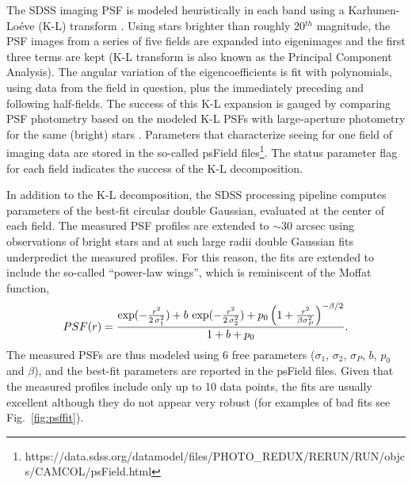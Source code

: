 The SDSS imaging PSF is modeled 
heuristically in each band using a Karhunen-Lo\'{e}ve (K-L) transform \citep{Lupton2002}. 
Using stars brighter than roughly 20$^{th}$ magnitude, the PSF images from a series of five 
fields are expanded into eigenimages and the first three terms are kept (K-L transform is 
also known as the Principal Component Analysis). The angular variation of the eigencoefficients
is fit with polynomials, using data from the field in question, plus the immediately preceding 
and following half-fields. The success of this K-L expansion is gauged by comparing PSF 
photometry based on the modeled K-L PSFs with large-aperture photometry for the same 
(bright) stars \citep{SDSSEDR}. 
Parameters that characterize seeing for one field of imaging data are stored in the so-called psField 
files\footnote{https://data.sdss.org/datamodel/files/PHOTO\_REDUX/RERUN/RUN/objcs/CAMCOL/psField.html}. 
The status parameter flag for each field indicates the success of the K-L decomposition.

In addition to the K-L decomposition, the SDSS processing pipeline computes parameters of the 
best-fit circular double Gaussian, evaluated at the center of each field. The measured PSF profiles are 
extended to $\sim$30 arcsec using observations of bright stars and at such large radii 
double Gaussian fits underpredict the measured profiles. For this reason, the fits are extended 
to include the so-called ``power-law wings'', which is reminiscent of
the Moffat function,
\begin{equation}
\label{eq:SDSSPSF}
        PSF(r) = {\exp(-{r^2\over 2\,\sigma_1^2}) + b\,\exp(-{r^2\over 2\,\sigma_2^2})
           + p_0\left(1 + { r^2 \over \beta \sigma_P^2}\right)^{-\beta/2} \over 1 + b + p_0}.
\end{equation} 
The measured PSFs are thus modeled using 6 free parameters ($\sigma_1$, $\sigma_2$, $\sigma_P$,
$b$, $p_0$ and $\beta$), and the best-fit parameters are reported in the psField files. 
Given that the measured profiles include only up to 10 data points, the fits are usually excellent
although they do not appear very robust (for examples of bad fits see Fig.~\ref{fig:psffit}). 

